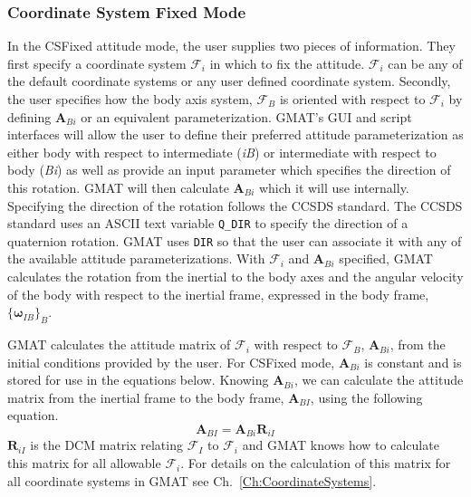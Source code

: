 \subsubsection{Coordinate System Fixed Mode}

In the CSFixed attitude mode, the user supplies two pieces of information.  They
first specify a coordinate system $\mathcal{F}_i$ in which to fix the attitude.
$\mathcal{F}_i$ can be any of the default coordinate systems or any user defined
coordinate system.  Secondly, the user specifies how the body axis system,
$\mathcal{F}_B$ is oriented with respect to $\mathcal{F}_i$ by defining
$\mathbf{A}_{Bi}$ or an equivalent parameterization.  GMAT's GUI and script
interfaces will allow the user to define their preferred attitude
parameterization as either body with respect to intermediate (\emph{iB}) or
intermediate with respect to body (\emph{Bi}) as well as provide an input
parameter which specifies the direction of this rotation.  GMAT will then
calculate $\mathbf{A}_{Bi}$ which it will use internally.  Specifying the
direction of the rotation follows the CCSDS standard.  The CCSDS standard uses
an ASCII text variable \texttt{Q\_DIR} to specify the direction of a quaternion
rotation.  GMAT uses \texttt{DIR} so that the user can associate it with any of
the available attitude parameterizations.  With $\mathcal{F}_i$ and
$\mathbf{A}_{Bi}$ specified, GMAT calculates the rotation from the inertial to
the body axes and the angular velocity of the body with respect to the inertial
frame, expressed in the body frame, $\{\mathbf{\boldsymbol\omega}_{IB}\}_B$.

GMAT calculates the attitude matrix of $\mathcal{F}_i$ with respect to
$\mathcal{F}_B$, $\mathbf{A}_{Bi}$, from the initial conditions provided by the
user.  For CSFixed mode, $\mathbf{A}_{Bi}$ is constant and is stored for use in
the equations below.  Knowing $\mathbf{A}_{Bi}$, we can calculate the attitude
matrix from the inertial frame to the body frame, $\mathbf{A}_{BI}$, using the
following equation.
%
\begin{equation}
    \mathbf{A}_{BI} = \mathbf{A}_{Bi}\mathbf{R}_{iI}
    \label{Eq:CSFixedRotationMatrix}
\end{equation}
%
$\mathbf{R}_{iI}$ is the DCM matrix relating $\mathcal{F}_I$ to $\mathcal{F}_i$
and GMAT knows how to calculate this matrix for all allowable $\mathcal{F}_i$.
For details on the calculation of this matrix for all coordinate systems in GMAT
see Ch.~\ref{Ch:CoordinateSystems}.

